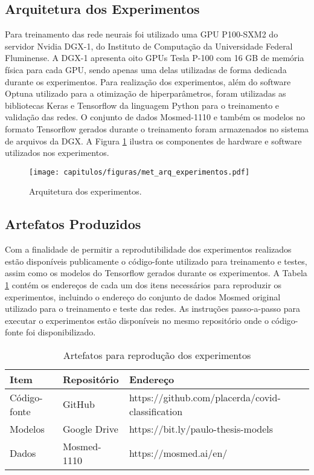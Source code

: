 \subsection{Arquitetura dos Experimentos}\label{subsec:cap_metodo_arquitetura}

Para treinamento das rede neurais foi utilizado uma GPU P100-SXM2 do servidor Nvidia DGX-1, do Instituto de Computação da Universidade Federal Fluminense. A DGX-1 apresenta oito GPUs Tesla P-100 com 16 GB de memória física para cada GPU, sendo apenas uma delas utilizadas de forma dedicada durante os experimentos. Para realização dos experimentos, além do software Optuna utilizado para a otimização de hiperparâmetros, foram utilizadas as bibliotecas Keras e Tensorflow \cite{abadi2016tensorflow} da linguagem Python para o treinamento e validação das redes. O conjunto de dados Mosmed-1110 e também os modelos no formato Tensorflow gerados durante o treinamento foram armazenados no sistema de arquivos da DGX. A Figura \ref{fig:met_arq_experimentos} ilustra os componentes de hardware e software utilizados nos experimentos.

\begin{figure}[!ht]
\centering
\texttt{[image: capitulos/figuras/met\_arq\_experimentos.pdf]}
\caption{Arquitetura dos experimentos.}
\label{fig:met_arq_experimentos}
\end{figure}

\subsection{Artefatos Produzidos}\label{subsec:cap_metodo_codigo}

Com a finalidade de permitir a reprodutibilidade dos experimentos realizados estão disponíveis publicamente o código-fonte utilizado para treinamento e testes, assim como os modelos do Tensorflow gerados durante os experimentos. A Tabela \ref{table:met_artefatos_gerados} contém os endereços de cada um dos itens necessários para reproduzir os experimentos, incluindo o endereço do conjunto de dados Mosmed original utilizado para o treinamento e teste das redes. As instruções passo-a-passo para executar o experimentos estão disponíveis no mesmo repositório onde o código-fonte foi disponibilizado.

\begin{table}[]
\centering
\caption{Artefatos para reprodução dos experimentos}
\label{table:met_artefatos_gerados}
\begin{tabular}{@{}lll@{}}
\toprule
Item         & Repositório  & Endereço                                         \\ \midrule
Código-fonte & GitHub       & https://github.com/placerda/covid-classification \\
Modelos      & Google Drive & https://bit.ly/paulo-thesis-models               \\
Dados        & Mosmed-1110  & https://mosmed.ai/en/                            \\ \bottomrule
\end{tabular}
\end{table}


